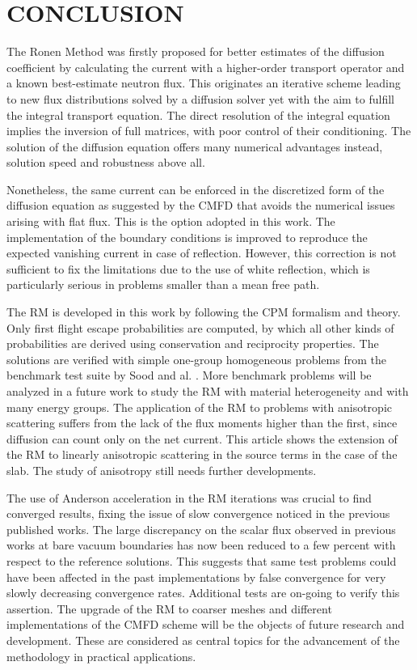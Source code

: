\documentclass{ictt26}
\begin{document}
\section{CONCLUSION}
\label{sec:cncls}

The Ronen Method was firstly proposed for better estimates of the diffusion coefficient by calculating the current with a higher-order transport operator and a known best-estimate neutron flux. This originates an iterative scheme leading to new flux distributions solved by a diffusion solver yet with the aim to fulfill the integral transport equation. The direct resolution of the integral equation implies the inversion of full matrices, with poor control of their conditioning. The solution of the diffusion equation offers many numerical advantages instead, solution speed and robustness above all.

Nonetheless, the same current can be enforced in the discretized form of the diffusion equation as suggested by the CMFD that avoids the numerical issues arising with flat flux. This is the option adopted in this work. The implementation of the boundary conditions is improved to reproduce the expected vanishing current in case of reflection. However, this correction is not sufficient to fix the limitations due to the use of white reflection, which is particularly serious in problems smaller than a mean free path.

The RM is developed in this work by following the CPM formalism and theory. Only first flight escape probabilities are computed, by which all other kinds of probabilities are derived using conservation and reciprocity properties. The solutions are verified with simple one-group homogeneous problems from the benchmark test suite by Sood and al. \cite{sood2003analytical}. More benchmark problems will be analyzed in a future work to study the RM with material heterogeneity and with many energy groups. The application of the RM to problems with anisotropic scattering suffers from the lack of the flux moments higher than the first, since diffusion can count only on the net current. This article shows the extension of the RM to linearly anisotropic scattering in the source terms in the case of the slab. The study of anisotropy still needs further developments.

The use of Anderson acceleration in the RM iterations was crucial to find converged results, fixing the issue of slow convergence noticed in the previous published works. The large discrepancy on the scalar flux observed in previous works at bare vacuum boundaries has now been reduced to a few percent with respect to the reference solutions. This suggests that same test problems could have been affected in the past implementations by false convergence for very slowly decreasing convergence rates. Additional tests are on-going to verify this assertion. The upgrade of the RM to coarser meshes and different implementations of the CMFD scheme will be the objects of future research and development. These are considered as central topics for the advancement of the methodology in practical applications.
\end{document}

